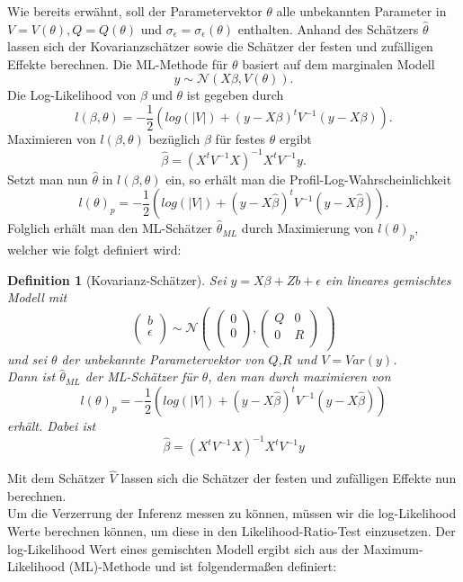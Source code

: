 \documentclass[%
thesis=student,%
coverpage=false,%
titlepage=false,%
headmarks=true, %
german,%
font=libertine, %
math=newpxtx, %
BCOR=5mm,%
coverBCOR=11mm%
]{tumbook}
\theoremstyle{break}
\newtheorem{definition}{Definition}[section]
\begin{document}
Wie bereits erwähnt, soll der Parametervektor $\theta$ alle unbekannten Parameter in $V= V(\theta), Q = Q(\theta)$ und $\sigma_\epsilon = \sigma_\epsilon(\theta)$ enthalten. Anhand des Schätzers $\hat{\theta}$  lassen sich der Kovarianzschätzer sowie die Schätzer der festen und zufälligen Effekte berechnen. 
Die ML-Methode für $\theta$ basiert auf dem marginalen Modell 
$$y \sim \mathcal{N}(X\beta,V(\theta)).$$
Die Log-Likelihood von $\beta$ und $\theta$ ist gegeben durch
$$l(\beta,\theta) = - \frac{1}{2} (log(|V|)+(y-X\beta)^tV^{-1}(y-X\beta)).$$
Maximieren von $l(\beta,\theta)$ bezüglich $\beta$ für festes $\theta$ ergibt 
$$ \hat{\beta} = (X^tV^{-1}X)^{-1}X^tV^{-1}y.$$
Setzt man nun $\hat{\theta}$ in $l(\beta,\theta)$ ein, so erhält man die Profil-Log-Wahrscheinlichkeit 
$$ l(\theta)_p = - \frac{1}{2} (log(|V|)+(y-X\hat{\beta})^tV^{-1}(y-X\hat{\beta})).$$
Folglich erhält man den ML-Schätzer $\hat{\theta}_{ML}$ durch Maximierung von $l(\theta)_p$, welcher wie folgt definiert wird:
\begin{definition}[Kovarianz-Schätzer]
	Sei $y = X\beta + Zb + \epsilon $ ein lineares gemischtes Modell mit $$\begin{pmatrix}
		b \\
		\epsilon \\
	\end{pmatrix}
	\sim
	\mathcal{N}
	\begin{pmatrix}
		\begin{pmatrix}
			
			0 \\
			0 \\
		\end{pmatrix},
		\begin{pmatrix}
			Q & 0 \\
			0 & R \\
		\end{pmatrix}
	\end{pmatrix}$$ und sei $\theta$ der unbekannte Parametervektor von $Q$,$R$ und $V=Var(y)$. \\
	Dann ist $\hat{\theta}_{ML}$ der ML-Schätzer für $\theta$, den man durch maximieren von $$  l(\theta)_p = - \frac{1}{2} (log(|V|)+(y-X\hat{\beta})^tV^{-1}(y-X\hat{\beta})) $$erhält.
	Dabei ist $$ \hat{\beta} = (X^tV^{-1}X)^{-1}X^tV^{-1}y$$
\end{definition} \noindent
Mit dem Schätzer $\hat{V}$ lassen sich die Schätzer der festen und zufälligen Effekte nun berechnen.\\
Um die Verzerrung der Inferenz messen zu können, müssen wir die  log-Likelihood Werte berechnen können, um diese in den Likelihood-Ratio-Test einzusetzen. Der log-Likelihood Wert eines gemischten Modell ergibt sich aus der Maximum-Likelihood (ML)-Methode und ist folgendermaßen definiert:
\end{document}

